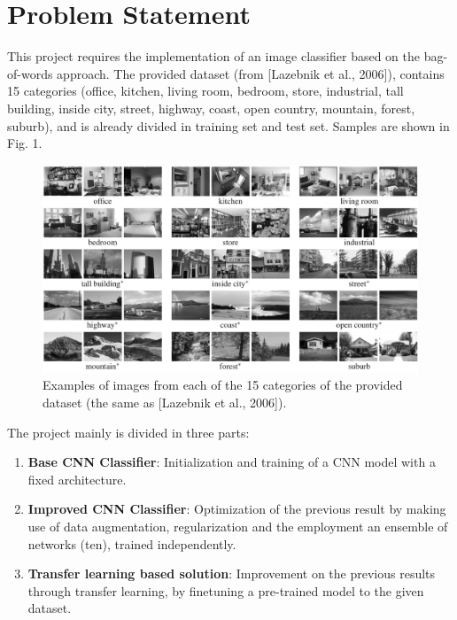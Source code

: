 \documentclass[12pt, a4paper, italian]{scrartcl}
\begin{document}

\newpage
\tableofcontents
\newpage


\section{Problem Statement}
This project requires the implementation of an image classifier based on the
bag-of-words approach. The provided dataset (from [Lazebnik et al., 2006]\cite{Lazebnik:Crosa}),
contains 15 categories (office, kitchen, living room, bedroom, store, industrial,
tall building, inside city, street, highway, coast, open country, mountain, forest,
suburb), and is already divided in training set and test set. Samples are shown
in Fig. 1.

 \begin{figure} [h!]
 \centering
  { \includegraphics[width=.85\textwidth]{fig/dataset_example.jpg} \caption{Examples of images from each of the 15 categories of the provided dataset (the same as [Lazebnik et al., 2006]).
}} 
  \end{figure}
  


The project mainly is divided in three parts:
\begin{enumerate}
	\item \textbf{Base CNN Classifier}: Initialization and training of a CNN model with a fixed architecture.
	\item \textbf{Improved CNN Classifier}: Optimization of the previous result by making use of data augmentation, regularization and the employment an ensemble of networks (ten), trained independently.
	\item \textbf{Transfer learning based solution}: Improvement on the previous results through transfer learning, by finetuning a pre-trained model to the given dataset.
\end{enumerate}
\end{document}
